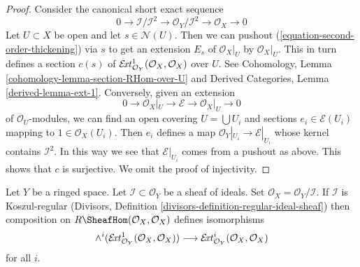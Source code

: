 \begin{proof}
Consider the canonical short exact sequence
\begin{equation}
\label{equation-second-order-thickening}
0 \to \mathcal{I}/\mathcal{I}^2 \to \mathcal{O}_Y/\mathcal{I}^2 \to
\mathcal{O}_X \to 0
\end{equation}
Let $U \subset X$ be open and let $s \in \mathcal{N}(U)$. Then we can
pushout (\ref{equation-second-order-thickening}) via $s$ to
get an extension $E_s$ of $\mathcal{O}_X|_U$ by $\mathcal{O}_X|_U$.
This in turn defines a section $c(s)$ of
$\mathcal{E}\!{\it xt}^1_{\mathcal{O}_Y}(\mathcal{O}_X, \mathcal{O}_X)$
over $U$.
See Cohomology, Lemma \ref{cohomology-lemma-section-RHom-over-U}
and Derived Categories, Lemma \ref{derived-lemma-ext-1}.
Conversely, given an extension
$$
0 \to \mathcal{O}_X|_U \to \mathcal{E} \to \mathcal{O}_X|_U \to 0
$$
of $\mathcal{O}_U$-modules, we can find an open covering
$U = \bigcup U_i$ and sections $e_i \in \mathcal{E}(U_i)$
mapping to $1 \in \mathcal{O}_X(U_i)$. Then $e_i$ defines a map
$\mathcal{O}_Y|_{U_i} \to \mathcal{E}|_{U_i}$ whose kernel
contains $\mathcal{I}^2$. In this way we see that
$\mathcal{E}|_{U_i}$ comes from a pushout as above.
This shows that $c$ is surjective. We omit the proof
of injectivity.
\end{proof}

\begin{lemma}
\label{lemma-regular-ideal-ext}
Let $Y$ be a ringed space. Let $\mathcal{I} \subset \mathcal{O}_Y$
be a sheaf of ideals. Set $\mathcal{O}_X = \mathcal{O}_Y/\mathcal{I}$.
If $\mathcal{I}$ is Koszul-regular
(Divisors, Definition \ref{divisors-definition-regular-ideal-sheaf})
then composition on $R\SheafHom(\mathcal{O}_X, \mathcal{O}_X)$
defines isomorphisms
$$
\wedge^i(\mathcal{E}\!{\it xt}^1_{\mathcal{O}_Y}(\mathcal{O}_X, \mathcal{O}_X))
\longrightarrow
\mathcal{E}\!{\it xt}^i_{\mathcal{O}_Y}(\mathcal{O}_X, \mathcal{O}_X)
$$
for all $i$.
\end{lemma}

